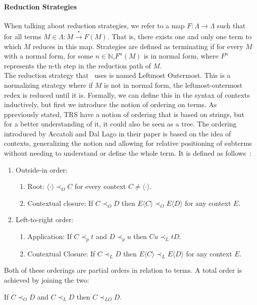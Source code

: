 \documentclass[12pt]{article}
\begin{document}
\paragraph{Reduction Strategies}
When talking about reduction strategies, we refer to a map $F : \Lambda \rightarrow \Lambda$ such that for all terms $M \in \Lambda : M \xrightarrow{*} F(M)$. That is, there exists one and only one term to which $M$ reduces in this map. Strategies are defined as terminating if for every $M$ with a normal form, for some $n \in \mathbb{N}$,$ F^{n} (M)$ is in normal form, where $F^{n}$ represents the n-th step in the reduction path of $M$. \\
The reduction strategy that~\cite{beta-invariance} uses is named Leftmost Outermost. This is a normalizing strategy where if $M$ is not in normal form, the leftmost-outermost redex is reduced until it is. Formally, we can define this in the syntax of contexts inductively, but first we introduce the notion of ordering on terms. As ppreviously stated, TRS have a notion of ordering that is based on strings, but for a better understanding of it, it could also be seen as a tree. The ordering introduced by Accatoli and Dal Lago in their paper is based on the idea of contexts, generalizing the notion and allowing for relative positioning of subterms without needing to understand or define the whole term. It is defined as follows~\cite{beta-invariance}:
\begin{enumerate}
  \item Outside-in order:
        \begin{enumerate}
          \item Root: $\langle \cdot \rangle \prec_{O} C$ for every context $C \neq \langle \cdot \rangle$.
          \item Contextual closure: If $C \prec_{O} D$ then $E\langle C \rangle \prec_{O} E\langle D \rangle $ for any context $E$.
        \end{enumerate}
  \item Left-to-right order:
        \begin{enumerate}
          \item Application: If $C \prec_{p} t$ and $D \prec_{p} u$ then $Cu \prec_{L} tD$.
          \item Contextual Closure: If $C \prec_{L} D$ then  $E\langle C \rangle \prec_{L} E\langle D\rangle$ for any context $E$.
        \end{enumerate}
\end{enumerate}
Both of these orderings are partial orders in relation to terms. A total order is achieved by joining the two:
\begin{center}
  If $C \prec_{O} D$ and $C \prec_{L} D$ then $C \prec_{LO} D$.
\end{center}
\end{document}
